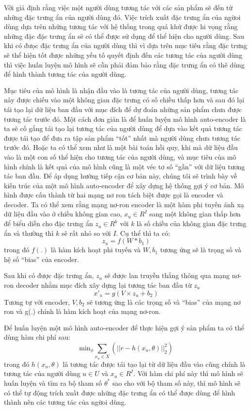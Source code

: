     Với giả định rằng việc một người dùng tương tác với các sản phẩm sẽ đến từ những đặc trưng ẩn của người dùng đó. 
    Việc trích xuất đặc trưng ẩn của ngừoi dùng dựa trên những tương tác với hệ thống trong quá khứ được hi vọng rằng những đặc đặc trưng ẩn sẽ có thể được sử dụng để thể hiện cho người dùng. 
    Sau khi có đưọc đặc trưng ẩn của người dùng thì vì dựa trên mục tiêu rằng đặc trưng sẽ thể hiện tốt được những yếu tố quyết định đến các tương tác của người dùng thì việc huấn luyện mô hình sẽ cần phải đảm bảo rằng đặc trưng ẩn có thê dùng để hình thành tương tác của người dùng. 

    
    Mục tiêu của mô hình là nhận đầu vào là tương tác của người dùng, tương tác này được chiếu vào một không gian đặc trưng có số chiều thấp hơn và sau đó lại tái tạo lại dữ liệu ban đầu với mục đích để dự đoán những sản phẩm chưa được tương tác trước đó.
    Một cách đơn giản là để huấn luyện mô hình auto-encoder là ta sẽ cố gắng tái tạo lại tương tác của người dùng để dựa vào kết quả tương tác được tái tạo để đưa ra tập sản phẩm ``tốt'' nhất mà người dùng chưa tương tác trước đó. Hoặc ta có thể xem như là một bài toán hồi quy, khi mà dữ liệu đầu vào là một con số thể hiện cho tương tác của người dùng, và mục tiêu của mô hình chính là kết quả của mô hình cũng là một véc tơ số ``gần'' với dữ liệu tương tác ban đầu.  
    Để áp dụng hướng tiếp cận cơ bản này, chúng tôi sẽ trình bày về kiến trúc của một mô hình auto-encoder để xây dựng hệ thống gợi ý cơ bản.
    Mô hình được cấu thành từ hai mạng nơ ron tách biệt được gọi là encoder và decoder. 
    Ta có thể xem rằng mạng nơ-ron encoder là một hàm phi tuyến ánh xạ dữ liệu đầu vào ở chiều không gian cao, $x_u \in R^I$ sang một không gian thấp hơn để biểu diễn cho đặc trưng ẩn $z_u \in R^k$ với $k$ là số chiều của không gian đặc trưng ẩn và thường thì $k$ sẽ rất nhỏ so với $I$. Cụ thể thì ta có:
    $$ z_u = f(W * b_1)$$
    trong đó $f(.)$ là hàm kích hoạt phi tuyến và $W,b_1$ tương ứng sẽ là trọng số và hệ số ``bias'' của encoder. 

    Sau khi có được đặc trưng ẩn, $z_u$ sẽ được lan truyền thẳng thông qua mạng nơ-ron decoder nhằm mục đích xây dựng lại tương tác ban đầu từ $z_u$
    $$x'_u = g(V \times z_u + b_2)$$
    Tương tự với encoder, $V,b_2$ sẽ tương ứng là các trọng số và ``bias'' của mạng nơ ron và g(.) chính là hàm kích hoạt của mạng nơ-ron.

    Để huấn luyện một mô hình auto-encoder để thực hiện gợi ý sản phẩm ta có thể dùng hàm chi phí sau:
    $$ \text{min}_\phi \sum_{x_u \in X}(||r - h(x_u,\theta)||^2_2)$$
    trong đó $h(x_u,\theta)$ là tương tác được tái tạo lại từ dữ liệu đầu vào cũng chính là tương tác của người dùng $u \in U$ và $x_u \in R^I$.
    Với hàm chi phí này thì mô hình sẽ huấn luyện và tìm ra bộ tham số $\theta^*$ sao cho với bộ tham số này, thì mô hình sẽ có thể tự động trích xuất được những đặc trưng ẩn có thể được dùng để hình thành nên các tương tác của ngừoi dùng.

